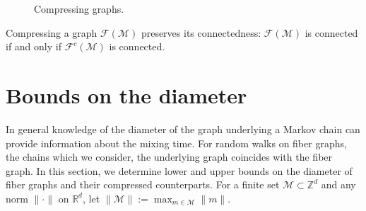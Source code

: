 \documentclass[11pt]{amsart}
\theoremstyle{definition}
\numberwithin{equation}{section}
\newcommand{\ring}[1]{\ensuremath{\mathbb{#1}}}
\renewcommand{\>}{\rangle}
\newcommand{\<}{\langle}
\newcommand{\0}{\mathbf{0}}
\newcommand{\1}{\mathbf{1}}
\newcommand{\2}{\mathbf{2}}
\newcommand\RR{\ring{R}}
\newcommand\ZZ{\ring{Z}}
\newcommand\cF{{\mathcal F}}
\newcommand\cM{{\mathcal M}}
\begin{document}
\begin{figure}[htbp]
\begin{minipage}[b]{0.45\textwidth}
\begin{minipage}[b]{0.45\textwidth}
   \end{minipage}
   \end{minipage}
	\caption{\label{f:CompressedFibergraph}Compressing graphs.}
\end{figure}

Compressing a graph $\cF(\cM)$ preserves its connectedness: $\cF(\cM)$
is connected if and only if $\cF^c(\cM)$ is connected.

\section{Bounds on the diameter}\label{s:Diameter}

In general knowledge of the diameter of the graph underlying a Markov
chain can provide information about the mixing time. For random walks
on fiber graphs, the chains which we consider, the underlying graph
coincides with the fiber graph. In this section, we determine lower
and upper bounds on the diameter of fiber graphs and their compressed
counterparts.  For a finite set
$\cM\subset\ZZ^d$ and any norm $\|\cdot\|$ on $\RR^d$, let $\|\cM\|:=\max_{m\in\cM}\|m\|$.
\end{document}
